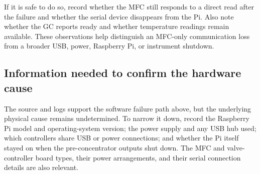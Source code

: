 If it is safe to do so, record whether the MFC still responds to a direct
read after the failure and whether the serial device disappears from the
Pi. Also note whether the GC reports ready and whether temperature readings
remain available. These observations help distinguish an MFC-only
communication loss from a broader USB, power, Raspberry Pi, or instrument
shutdown.

\subsection{Information needed to confirm the hardware cause}

The source and logs support the software failure path above, but the
underlying physical cause remains undetermined. To narrow it down, record
the Raspberry Pi model and operating-system version; the power supply and
any USB hub used; which controllers share USB or power connections; and
whether the Pi itself stayed on when the pre-concentrator outputs shut down.
The MFC and valve-controller board types, their power arrangements, and
their serial connection details are also relevant.

